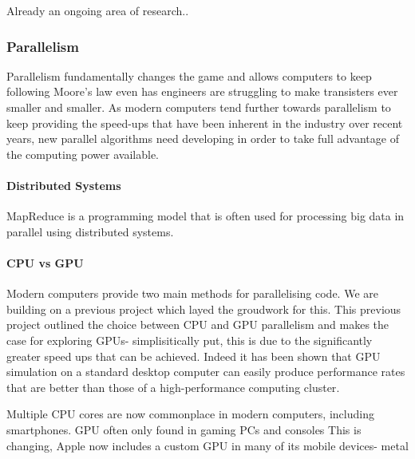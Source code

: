 \documentclass{UoYCSproject}
\begin{document}
Already an ongoing area of research.. 


\subsubsection{Parallelism}
Parallelism fundamentally changes the game and allows computers to keep following Moore's law even has engineers are struggling to make transisters ever smaller and smaller\cite{concurrency_revolution}. As modern computers tend further towards parallelism to keep providing the speed-ups that have been inherent in the industry over recent years, new parallel algorithms need developing in order to take full advantage of the computing power available.


\paragraph{Distributed Systems}
MapReduce is a programming model that is often used for processing big data in parallel using distributed systems.

\paragraph{CPU vs GPU}
Modern computers provide two main methods for parallelising code.
We are building on a previous project\cite{phil_diss} which layed the groudwork for this.
This previous project outlined the choice between CPU and GPU parallelism and makes the case for exploring GPUs- simplisitically put, this is due to the significantly greater speed ups that can be achieved. Indeed it has been shown that GPU simulation on a standard desktop computer can easily produce performance rates that are better than those of a high-performance computing cluster\cite{flame_simulation}.

Multiple CPU cores are now commonplace in modern computers, including smartphones.
GPU often only found in gaming PCs and consoles
This is changing, Apple now includes a custom GPU in many of its mobile devices- metal
\end{document}
